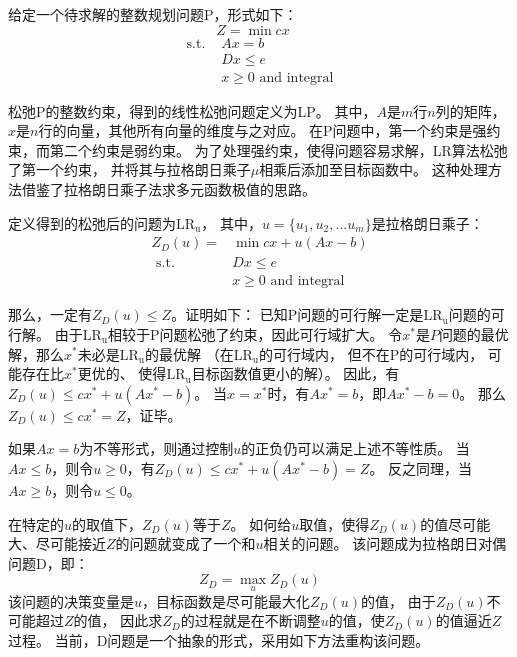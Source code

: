 给定一个待求解的整数规划问题P，形式如下：
$$
Z = \min c x  \quad
$$
\begin{equation}
    \begin{aligned}
        \text { s.t. }  & A x =b\\
         & D x \leq e \\
         & x \geq 0 \text { and integral }
    \end{aligned}
\end{equation}


松弛P的整数约束，得到的线性松弛问题定义为LP。
其中，$A$是$m$行$n$列的矩阵，$x$是$n$行的向量，其他所有向量的维度与之对应。
在P问题中，第一个约束是强约束，而第二个约束是弱约束。
为了处理强约束，使得问题容易求解，LR算法松弛了第一个约束，
并将其与拉格朗日乘子$\mu$相乘后添加至目标函数中。
这种处理方法借鉴了拉格朗日乘子法求多元函数极值的思路。

定义得到的松弛后的问题为$\mathrm{LR_u}$，
其中，$u=\{u_1,u_2,...u_m\}$是拉格朗日乘子：
\begin{equation}
\begin{aligned}
Z_D(u)=        & \min c x + u(Ax-b) \\
\text { s.t. } & D x \leq e \\
               & x \geq 0 \text { and integral }
\end{aligned}
\end{equation}

那么，一定有$Z_D(u) \le Z$。证明如下：
已知P问题的可行解一定是$\mathrm{LR_u}$问题的可行解。
由于$\mathrm{LR_u}$相较于P问题松弛了约束，因此可行域扩大。
令$x^*$是$P$问题的最优解，那么$x^*$未必是$\mathrm{LR_u}$的最优解
（在$\mathrm{LR_u}$的可行域内，
但不在P的可行域内，
可能存在比$x^*$更优的、
使得$\mathrm{LR_u}$目标函数值更小的解）。
因此，有$Z_D(u) \le cx^*+u(Ax^*-b)$。
当$x=x^*$时，有$Ax^*=b$，即$Ax^*-b=0$。
那么$Z_D(u) \le cx^* = Z$，证毕。

如果$Ax=b$为不等形式，则通过控制$u$的正负仍可以满足上述不等性质。
当$Ax\le b$，则令$u\ge 0$，有$Z_D(u) \le cx^* + u(Ax^*-b)=Z$。
反之同理，当$Ax \ge b$，则令$u \le 0$。

在特定的$u$的取值下，$Z_D(u)$等于$Z$。
如何给$u$取值，使得$Z_D(u)$的值尽可能大、尽可能接近$Z$的问题就变成了一个和$u$相关的问题。
该问题成为拉格朗日对偶问题D，即：
\begin{equation}
Z_D = \max _u Z_D(u)
\end{equation}
该问题的决策变量是$u$，目标函数是尽可能最大化$Z_D(u)$的值，
由于$Z_D(u)$不可能超过$Z$的值，
因此求$Z_D$的过程就是在不断调整$u$的值，使$Z_D(u)$的值逼近$Z$过程。
当前，D问题是一个抽象的形式，采用如下方法重构该问题。

